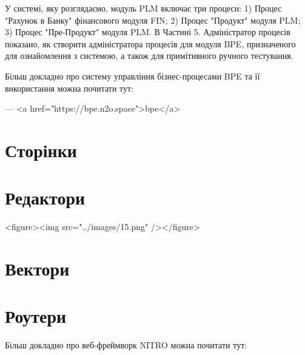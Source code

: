         У системі, яку розглядаємо, модуль PLM включає три процеси:
           1) Процес "Рахунок в Банку" фінансового модуля FIN;
           2) Процес "Продукт" модуля PLM;
           3) Процес "Пре-Продукт" модуля PLM.
           В Частині 5. Адміністратор процесів показано, як створити адміністратора процесів
           для модуля BPE, призначеного для ознайомлення з системою, а також для
           примітивного ручного тестування.

        Більш докладно про систему управління бізнес-процесами BPE та її використання
           можна почитати тут:

        — <a href="https://bpe.n2o.space">bpe</a>

        \section{Сторінки}
        \section{Редактори}

        <figure><img src="../images/15.png" /></figure>

        \section{Вектори}
        \section{Роутери}

        Більш докладно про веб-фреймворк NITRO
           можна почитати тут:


\section{}

